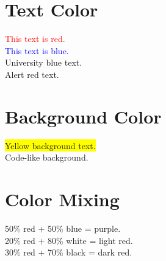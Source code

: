 \documentclass[12pt, a4paper]{article}
\begin{document}
\section*{Text Color}
\textcolor{red}{This text is red.} \\
\textcolor{blue}{This text is blue.} \\
\textcolor{universityblue}{University blue text.} \\
\textcolor{alertred}{Alert red text.}

\section*{Background Color}
\colorbox{yellow}{Yellow background text.} \\
\colorbox{codebg}{Code-like background.}

\section*{Color Mixing}
\textcolor{red!50!blue}{50\% red + 50\% blue = purple.} \\
\textcolor{red!20}{20\% red + 80\% white = light red.} \\
\textcolor{red!30!black}{30\% red + 70\% black = dark red.}
\end{document}
